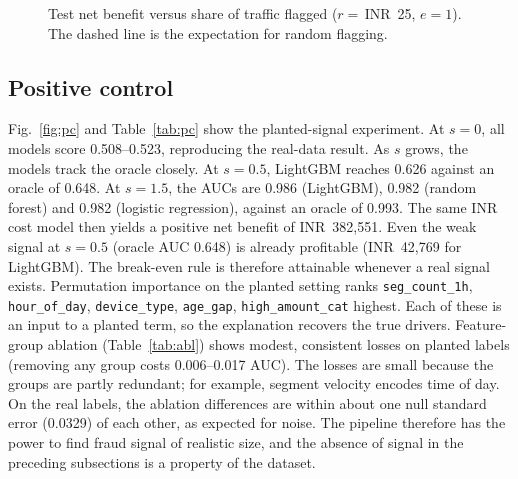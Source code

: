 \documentclass[conference]{IEEEtran}
\newcommand{\inr}{INR~}
\begin{document}
\begin{figure}[t]
\caption{Test net benefit versus share of traffic flagged ($r=$\,\inr25, $e=1$). The dashed line is the expectation for random flagging.}\label{fig:nb}
\end{figure}

\subsection{Positive control}\label{sec:pc}
Fig.~\ref{fig:pc} and Table~\ref{tab:pc} show the planted-signal experiment. At $s=0$, all models score 0.508--0.523, reproducing the real-data result. As $s$ grows, the models track the oracle closely. At $s=0.5$, LightGBM reaches 0.626 against an oracle of 0.648. At $s=1.5$, the AUCs are 0.986 (LightGBM), 0.982 (random forest) and 0.982 (logistic regression), against an oracle of 0.993. The same INR cost model then yields a positive net benefit of \inr382,551. Even the weak signal at $s=0.5$ (oracle AUC 0.648) is already profitable (\inr42,769 for LightGBM). The break-even rule is therefore attainable whenever a real signal exists. Permutation importance on the planted setting ranks \texttt{seg\_count\_1h}, \texttt{hour\_of\_day}, \texttt{device\_type}, \texttt{age\_gap}, \texttt{high\_amount\_cat} highest. Each of these is an input to a planted term, so the explanation recovers the true drivers. Feature-group ablation (Table~\ref{tab:abl}) shows modest, consistent losses on planted labels (removing any group costs 0.006--0.017 AUC). The losses are small because the groups are partly redundant; for example, segment velocity encodes time of day. On the real labels, the ablation differences are within about one null standard error (0.0329) of each other, as expected for noise. The pipeline therefore has the power to find fraud signal of realistic size, and the absence of signal in the preceding subsections is a property of the dataset.
\end{document}
